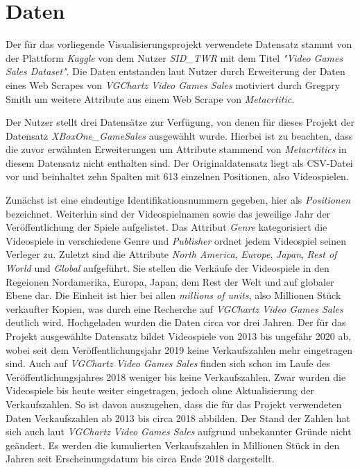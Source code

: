 \documentclass[usegeometry=true]{scrartcl}
\begin{document}

\section{Daten}
Der für das vorliegende Visualisierungsprojekt verwendete Datensatz stammt von der Plattform \textit{Kaggle} von dem Nutzer \textit{SID\_TWR} mit dem Titel \textit{"Video Games Sales Dataset"}.\cite{SID_TWR.} 
Die Daten entstanden laut Nutzer durch Erweiterung der Daten eines Web Scrapes von \textit{VGChartz Video Games Sales} motiviert durch Gregpry Smith um weitere Attribute aus einem Web Scrape von \textit{Metacrtitic}.  

Der Nutzer stellt drei Datensätze zur Verfügung, von denen für dieses Projekt der Datensatz \textit{XBoxOne\_GameSales} ausgewählt wurde. 
Hierbei ist zu beachten, dass die zuvor erwähnten Erweiterungen um Attribute stammend von \textit{Metacrtitics} in diesem Datensatz nicht enthalten sind. 
Der Originaldatensatz liegt als CSV-Datei vor und beinhaltet zehn Spalten mit 613 einzelnen Positionen, also Videospielen. 

Zunächst ist eine eindeutige Identifikationsnummern gegeben, hier als \textit{Positionen} bezeichnet. Weiterhin sind der Videospielnamen sowie das jeweilige Jahr der Veröffentlichung der Spiele aufgelistet. 
Das Attribut \textit{Genre} kategorisiert die Videospiele in verschiedene Genre und \textit{Publisher} ordnet jedem Videospiel seinen Verleger zu. 
Zuletzt sind die Attribute \textit{North America}, \textit{Europe}, \textit{Japan}, \textit{Rest of World} und \textit{Global} aufgeführt. 
Sie stellen die Verkäufe der Videospiele in den Regeionen Nordamerika, Europa, Japan, dem Rest der Welt und auf globaler Ebene dar. 
Die Einheit ist hier bei allen \textit{millions of units}, also Millionen Stück verkaufter Kopien, was durch eine Recherche auf \textit{VGChartz Video Games Sales} deutlich wird. %
Hochgeladen wurden die Daten circa vor drei Jahren. Der für das Projekt ausgewählte Datensatz bildet Videospiele von 2013 bis ungefähr 2020 ab, wobei seit dem Veröffentlichungsjahr 2019 keine Verkaufszahlen mehr eingetragen sind. 
Auch auf \textit{VGChartz Video Games Sales} finden sich schon im Laufe des Veröffentlichungsjahres 2018 weniger bis keine Verkaufszahlen. 
Zwar wurden die Videospiele bis heute weiter eingetragen, jedoch ohne Aktualisierung der Verkaufszahlen. 
So ist davon auszugehen, dass die für das Projekt verwendeten Daten Verkaufszahlen ab 2013 bis circa 2018 abbilden. 
Der Stand der Zahlen hat sich auch laut \textit{VGChartz Video Games Sales} aufgrund unbekannter Gründe nicht geändert. 
Es werden die kumulierten Verkaufszahlen in Millionen Stück in den Jahren seit Erscheinungsdatum bis circa Ende 2018 dargestellt. 
\end{document}
